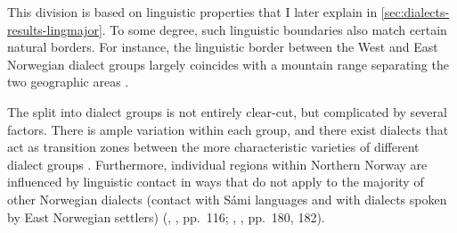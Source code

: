 This division is based on linguistic properties that I later explain in \autoref{sec:dialects-results-lingmajor}.
To some degree, such linguistic boundaries also match certain natural borders. For instance, the linguistic border between the West and East Norwegian dialect groups largely coincides with a mountain range separating the two geographic areas \cite[p.~104]{sandoey1991dialektkunnskap}.

The split into dialect groups is not entirely clear-cut, but complicated by several factors.
There is ample variation within each group, and there exist dialects that act as transition zones between the more characteristic varieties of different dialect groups \cite[p.~29]{maehlum2012dialektlandskapet}. 
Furthermore, individual regions within Northern Norway are influenced by linguistic contact in ways that do not apply to the majority of other Norwegian dialects (contact with Sámi languages and with dialects spoken by East Norwegian settlers) (\citeauthor{maehlum2012dialektlandskapet}, \citeyear{maehlum2012dialektlandskapet}, pp.~116; \citeauthor{jahr1990dialekter}, \citeyear{jahr1990dialekter}, pp.~180, 182).


\FloatBarrier